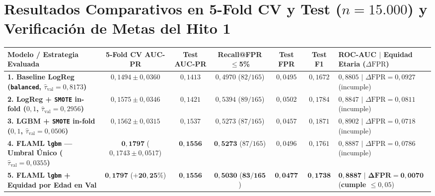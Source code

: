 \documentclass[9pt,letterpaper]{article}
\begin{document}
\section{Resultados Comparativos en 5-Fold CV y Test ($n=15.000$) y Verificación de Metas del Hito 1}
\vspace{1pt}
{\scriptsize
\begin{tabularx}{\textwidth}{@{}l c c c c c X@{}}
\toprule
\textbf{Modelo / Estrategia Evaluada} & \textbf{5-Fold CV AUC-PR} & \textbf{Test AUC-PR} & \textbf{Recall@FPR$\le$5\%} & \textbf{Test FPR} & \textbf{Test F1} & \textbf{ROC-AUC $|$ Equidad Etaria ($\Delta\text{FPR}$)} \\
\midrule
\textbf{1. Baseline LogReg (\texttt{balanced}, $\hat{\tau}_{\text{val}}=0,8173$)} & $0,1494 \pm 0,0360$ & $0,1413$ & $0,4970$ ($82/165$) & $0,0495$ & $0,1672$ & $0,8805$ $|$ $\Delta\text{FPR}=0,0927$ (incumple) \\
\textbf{2. LogReg + \texttt{SMOTE} in-fold ($0,1$, $\hat{\tau}_{\text{val}}=0,2956$)} & $0,1575 \pm 0,0346$ & $0,1421$ & $0,5394$ ($89/165$) & $0,0502$ & $0,1784$ & $0,8847$ $|$ $\Delta\text{FPR}=0,0811$ (incumple) \\
\textbf{3. LGBM + \texttt{SMOTE} in-fold ($0,1$, $\hat{\tau}_{\text{val}}=0,0506$)} & $0,1562 \pm 0,0315$ & $0,1537$ & $0,5273$ ($87/165$) & $0,0457$ & $0,1871$ & $0,8902$ $|$ $\Delta\text{FPR}=0,0718$ (incumple) \\
\textbf{4. FLAML \texttt{lgbm} --- Umbral Único ($\hat{\tau}_{\text{val}}=0,0355$)} & $\mathbf{0,1797}$ ($0,1743\pm 0,0517$) & $\mathbf{0,1556}$ & $\mathbf{0,5273}$ ($87/165$) & $0,0496$ & $0,1761$ & $0,8887$ $|$ $\Delta\text{FPR}=0,0786$ (incumple) \\
\textbf{5. FLAML \texttt{lgbm} + Equidad por Edad en Val} & $\mathbf{0,1797}$ ($\mathbf{+20,25\%}$) & $\mathbf{0,1556}$ & $\mathbf{0,5030}$ ($\mathbf{83/165}$) & $\mathbf{0,0477}$ & $\mathbf{0,1738}$ & $\mathbf{0,8887}$ $|$ $\mathbf{\Delta\text{FPR}=0,0070}$ (\textbf{cumple $\le 0,05$}) \\
\bottomrule
\end{tabularx}
}
\end{document}
